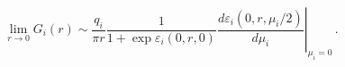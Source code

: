 \begin{equation}
\lim\limits_{r\rightarrow 0}G_{i}(r)\sim \frac{q_{i}}{\pi r}\frac{1}{1+\exp
\varepsilon _{i}(0,r,0)}\left. \frac{d\varepsilon _{i}(0,r,\mu _{i}/2)}{d\mu
_{i}}\right\vert _{\mu _{i}=0}\,.  \label{g0}
\end{equation}%
